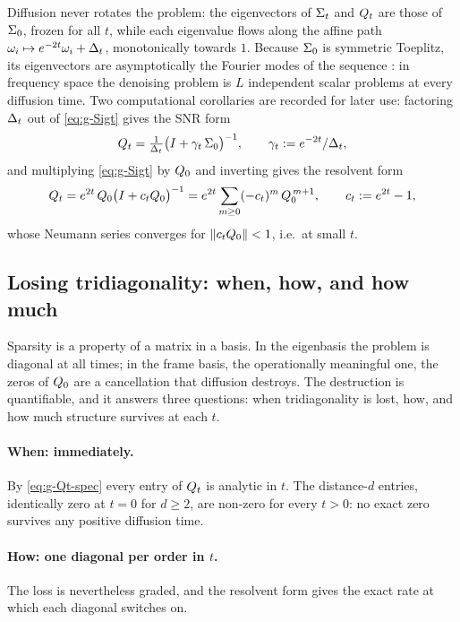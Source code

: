 Diffusion never rotates the problem: the eigenvectors of $\Sigma_t$ and
$Q_t$ are those of $\Sigma_0$, frozen for all $t$, while each eigenvalue
flows along the affine path $\omega_i \mapsto e^{-2t}\omega_i + \Delta_t$,
monotonically towards $1$. Because $\Sigma_0$ is symmetric Toeplitz, its
eigenvectors are asymptotically the Fourier modes of the sequence
: in frequency space the denoising problem is $L$
independent scalar problems at every diffusion time. Two computational
corollaries are recorded for later use: factoring $\Delta_t$ out of
\eqref{eq:g-Sigt} gives the SNR form
\begin{equation}
  Q_t = \tfrac{1}{\Delta_t} \big( I + \gamma_t\, \Sigma_0 \big)^{-1},
  \qquad \gamma_t := e^{-2t}/\Delta_t ,
  \label{eq:g-Qt-snr}
\end{equation}
and multiplying \eqref{eq:g-Sigt} by $Q_0$ and inverting gives the
resolvent form
\begin{equation}
  Q_t = e^{2t}\, Q_0 \big( I + c_t Q_0 \big)^{-1}
      = e^{2t} \sum_{m \geq 0} (-c_t)^m\, Q_0^{\,m+1},
  \qquad c_t := e^{2t} - 1 ,
  \label{eq:g-Qt-res}
\end{equation}
whose Neumann series converges for $\|c_t Q_0\| < 1$, i.e.\ at small $t$.

\subsection{Losing tridiagonality: when, how, and how much}
\label{sec:g-tridiag-loss}

Sparsity is a property of a matrix in a basis. In the eigenbasis the
problem is diagonal at all times; in the frame basis, the operationally
meaningful one, the zeros of $Q_0$ are a cancellation that diffusion
destroys. The destruction is quantifiable, and it answers three questions:
when tridiagonality is lost, how, and how much structure survives at
each $t$.

\paragraph{When: immediately.} By \eqref{eq:g-Qt-spec} every entry of
$Q_t$ is analytic in $t$. The distance-$d$ entries, identically zero at
$t = 0$ for $d \geq 2$, are non-zero for every $t > 0$: no exact zero
survives any positive diffusion time.

\paragraph{How: one diagonal per order in $t$.} The loss is nevertheless
graded, and the resolvent form gives the exact rate at which each diagonal
switches on.

